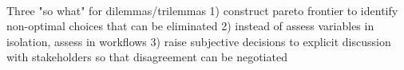 \ \\




Three "so what" for dilemmas/trilemmas
1) construct pareto frontier to identify non-optimal choices that can be eliminated
2) instead of assess variables in isolation, assess in workflows
3) raise subjective decisions to explicit discussion with stakeholders so that disagreement can be negotiated 



